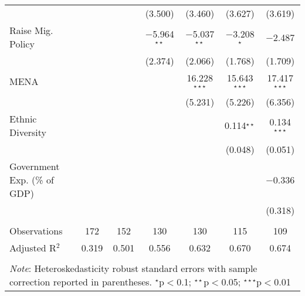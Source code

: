 \documentclass[../main.tex]{subfiles}
\begin{document}
\begin{table}[H]
\begin{tabular}{@{\extracolsep{5pt}}lcccccc}
  &  &  & (3.500) & (3.460) & (3.627) & (3.619) \\ 
  Raise Mig. Policy  &  &  & $-$5.964$^{\star\star}$ & $-$5.037$^{\star\star}$ & $-$3.208$^{\star}$ & $-$2.487 \\ 
  &  &  & (2.374) & (2.066) & (1.768) & (1.709) \\ 
  MENA &  &  &  & 16.228$^{\star\star\star}$ & 15.643$^{\star\star\star}$ & 17.417$^{\star\star\star}$ \\ 
  &  &  &  & (5.231) & (5.226) & (6.356) \\ 
  Ethnic Diversity &  &  &  &  & 0.114$^{\star\star}$ & 0.134$^{\star\star\star}$ \\ 
  &  &  &  &  & (0.048) & (0.051) \\ 
  Government Exp. (\% of GDP) &  &  &  &  &  & $-$0.336 \\ 
  &  &  &  &  &  & (0.318) \\ 
 \midrule \\[-2.5ex] 
Observations & 172 & 152 & 130 & 130 & 115 & 109 \\ 
Adjusted R$^{2}$ & 0.319 & 0.501 & 0.556 & 0.632 & 0.670 & 0.674 \\ 
\bottomrule \\[-1.8ex] 
\multicolumn{7}{l}{\textit{Note}: Heteroskedasticity robust standard errors with sample correction reported in parentheses. $^{\star}$p$<$0.1; $^{\star\star}$p$<$0.05; $^{\star\star\star}$p$<$0.01} \\ 
\end{tabular} 
\end{table} 
\end{document}
